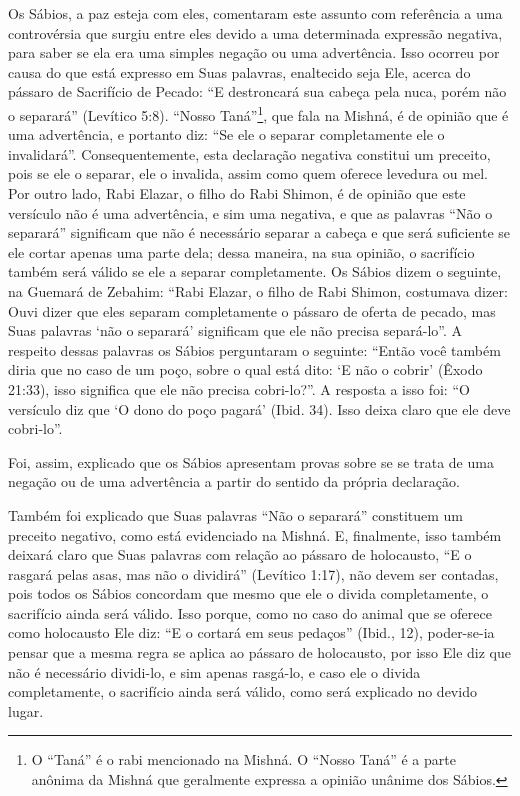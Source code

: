 Os Sábios, a paz esteja com eles, comentaram este assunto com
referência a uma controvérsia que surgiu entre eles devido a uma
determinada expressão negativa, para saber se ela era uma simples
negação ou uma advertência. Isso ocorreu por causa do que está expresso
em Suas palavras, enaltecido seja Ele, acerca do pássaro de Sacrifício
de Pecado: ``E destroncará sua cabeça pela nuca, porém não o separará''
(Levítico 5:8). ``Nosso Taná''\footnote{O ``Taná'' é o rabi mencionado na Mishná. O ``Nosso Taná'' é a
parte anônima da Mishná que geralmente expressa a opinião unânime dos
Sábios.}, que fala na Mishná,
é de opinião que é uma advertência, e portanto diz: ``Se ele o separar
completamente ele o invalidará''. Consequentemente, esta declaração
negativa constitui um preceito, pois se ele o separar, ele o invalida,
assim como quem oferece levedura ou mel. Por outro lado, Rabi Elazar, o
filho do Rabi Shimon, é de opinião que este versículo não é uma
advertência, e sim uma negativa, e que as palavras ``Não o separará''
significam que não é necessário separar a cabeça e que será suficiente
se ele cortar apenas uma parte dela; dessa maneira, na sua opinião, o
sacrifício também será válido se ele a separar completamente. Os Sábios
dizem o seguinte, na Guemará de Zebahim: ``Rabi Elazar, o filho de Rabi
Shimon, costumava dizer: Ouvi dizer que eles separam completamente o
pássaro de oferta de pecado, mas Suas palavras `não o separará'
significam que ele não precisa separá-lo''. A respeito dessas palavras
os Sábios perguntaram o seguinte: ``Então você também diria que no caso
de um poço, sobre o qual está
dito: `E não o cobrir' (Êxodo 21:33), isso significa que ele não precisa
cobri-lo?''. A resposta a isso foi: ``O versículo diz que `O dono do
poço pagará' (Ibid. 34). Isso deixa claro que ele deve cobri-lo''.

Foi, assim, explicado que os Sábios apresentam provas sobre se se trata
de uma negação ou de uma advertência a partir do sentido da própria
declaração.

Também foi explicado que Suas palavras ``Não o separará'' constituem um
preceito negativo, como está evidenciado na Mishná. E, finalmente, isso
também deixará claro que Suas palavras com relação ao pássaro de
holocausto, ``E o rasgará pelas asas, mas não o dividirá'' (Levítico
1:17), não devem ser contadas, pois todos os Sábios concordam que mesmo
que ele o divida completamente, o sacrifício ainda será válido. Isso
porque, como no caso do animal que se oferece como holocausto Ele diz:
``E o cortará em seus pedaços'' (Ibid., 12), poder-se-ia pensar que a
mesma regra se aplica ao pássaro de holocausto, por isso Ele diz que
não é necessário dividi-lo, e sim apenas rasgá-lo, e caso ele o divida
completamente, o sacrifício ainda será válido, como será explicado no
devido lugar.

